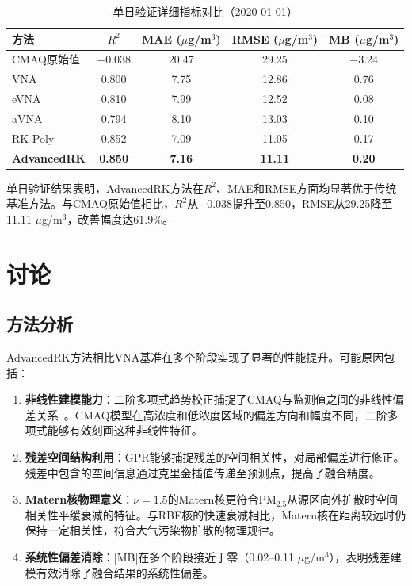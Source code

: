 \documentclass[UTF8, a4paper, 12pt]{article}
\begin{document}
\begin{table}[H]
\centering
\caption{单日验证详细指标对比（2020-01-01）}
\label{tab:single_day}
\begin{tabular}{@{}lcccc@{}}
\toprule
方法 & $R^2$ & MAE ($\mu$g/m$^3$) & RMSE ($\mu$g/m$^3$) & MB ($\mu$g/m$^3$) \\
\midrule
CMAQ原始值 & $-$0.038 & 20.47 & 29.25 & $-$3.24 \\
VNA & 0.800 & 7.75 & 12.86 & 0.76 \\
eVNA & 0.810 & 7.99 & 12.52 & 0.08 \\
aVNA & 0.794 & 8.10 & 13.03 & 0.10 \\
RK-Poly & 0.852 & 7.09 & 11.05 & 0.17 \\
\textbf{AdvancedRK} & \textbf{0.850} & \textbf{7.16} & \textbf{11.11} & \textbf{0.20} \\
\bottomrule
\end{tabular}
\end{table}

单日验证结果表明，AdvancedRK方法在$R^2$、MAE和RMSE方面均显著优于传统基准方法。与CMAQ原始值相比，$R^2$从$-$0.038提升至0.850，RMSE从29.25降至11.11 $\mu$g/m$^3$，改善幅度达61.9\%。

\section{讨论}

\subsection{方法分析}

AdvancedRK方法相比VNA基准在多个阶段实现了显著的性能提升。可能原因包括：

\begin{enumerate}
    \item \textbf{非线性建模能力}：二阶多项式趋势校正捕捉了CMAQ与监测值之间的非线性偏差关系~\cite{zheng2020kriging}。CMAQ模型在高浓度和低浓度区域的偏差方向和幅度不同，二阶多项式能够有效刻画这种非线性特征。

    \item \textbf{残差空间结构利用}：GPR能够捕捉残差的空间相关性，对局部偏差进行修正。残差中包含的空间信息通过克里金插值传递至预测点，提高了融合精度。

    \item \textbf{Matern核物理意义}：$\nu=1.5$的Matern核更符合PM$_{2.5}$从源区向外扩散时空间相关性平缓衰减的特征。与RBF核的快速衰减相比，Matern核在距离较远时仍保持一定相关性，符合大气污染物扩散的物理规律。

    \item \textbf{系统性偏差消除}：|MB|在多个阶段接近于零（0.02--0.11 $\mu$g/m$^3$），表明残差建模有效消除了融合结果的系统性偏差。
\end{enumerate}
\end{document}

